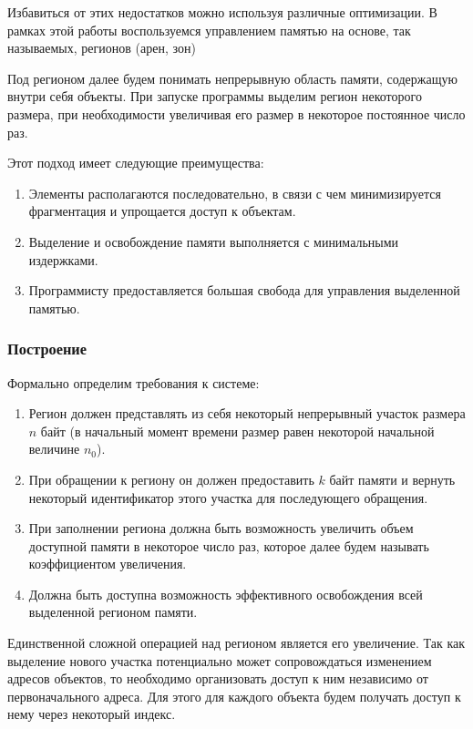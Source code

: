 \documentclass[coursework]{SCWorks}
\begin{document}
Избавиться от этих недостатков можно используя различные оптимизации. В рамках этой работы воспользуемся управлением памятью на основе, так называемых, регионов (арен, зон) \cite{refer1}

Под регионом далее будем понимать непрерывную область памяти, содержащую внутри себя объекты. При запуске программы выделим регион некоторого размера, при необходимости увеличивая его размер в некоторое постоянное число раз.

Этот подход имеет следующие преимущества:

\begin{enumerate}
	\item Элементы располагаются последовательно, в связи с чем минимизируется фрагментация и упрощается доступ к объектам.
	\item Выделение и освобождение памяти выполняется с минимальными издержками.
	\item Программисту предоставляется большая свобода для управления выделенной памятью.
\end{enumerate}

\subsubsection{Построение}

Формально определим требования к системе:

\begin{enumerate}
	\item Регион должен представлять из себя некоторый непрерывный участок размера $n$ байт (в начальный момент времени размер равен некоторой начальной величине $n_0$).
	\item При обращении к региону он должен предоставить $k$ байт памяти и вернуть некоторый идентификатор этого участка для последующего обращения.
	\item При заполнении региона должна быть возможность увеличить объем доступной памяти в некоторое число раз, которое далее будем называть коэффициентом увеличения.
	\item Должна быть доступна возможность эффективного освобождения всей выделенной регионом памяти.
\end{enumerate}

Единственной сложной операцией над регионом является его увеличение. Так как выделение нового участка потенциально может сопровождаться изменением адресов объектов, то необходимо организовать доступ к ним независимо от первоначального адреса. Для этого для каждого объекта будем получать доступ к нему через некоторый индекс.
\end{document}
